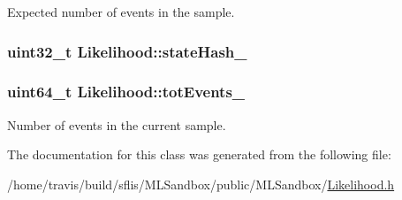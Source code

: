Expected number of events in the sample. 

\hypertarget{classLikelihood_a9a9940bdd1aa6ee5efd8da4a883c3d79}{
\subsubsection[{state\-Hash\-\_\-}]{\setlength{\rightskip}{0pt plus 5cm}uint32\-\_\-t Likelihood\-::state\-Hash\-\_\-\hspace{0.3cm}{\ttfamily [protected]}}}\label{classLikelihood_a9a9940bdd1aa6ee5efd8da4a883c3d79}
\hypertarget{classLikelihood_afc00e95dfa5a5c71d413830f50958d80}{
\subsubsection[{tot\-Events\-\_\-}]{\setlength{\rightskip}{0pt plus 5cm}uint64\-\_\-t Likelihood\-::tot\-Events\-\_\-}}\label{classLikelihood_afc00e95dfa5a5c71d413830f50958d80}


Number of events in the current sample. 



The documentation for this class was generated from the following file\-:\begin{DoxyCompactItemize}
\item 
/home/travis/build/sflis/\-M\-L\-Sandbox/public/\-M\-L\-Sandbox/\hyperlink{Likelihood_8h}{Likelihood.\-h}\end{DoxyCompactItemize}
